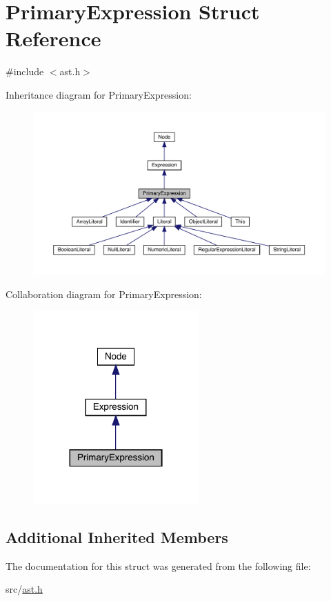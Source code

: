 \hypertarget{struct_primary_expression}{}\section{Primary\+Expression Struct Reference}
\label{struct_primary_expression}


{\ttfamily \#include $<$ast.\+h$>$}



Inheritance diagram for Primary\+Expression\+:\nopagebreak
\begin{figure}[H]
\begin{center}
\leavevmode
\includegraphics[width=350pt]{struct_primary_expression__inherit__graph}
\end{center}
\end{figure}


Collaboration diagram for Primary\+Expression\+:\nopagebreak
\begin{figure}[H]
\begin{center}
\leavevmode
\includegraphics[width=180pt]{struct_primary_expression__coll__graph}
\end{center}
\end{figure}
\subsection*{Additional Inherited Members}


The documentation for this struct was generated from the following file\+:\begin{DoxyCompactItemize}
\item 
src/\hyperlink{ast_8h}{ast.\+h}\end{DoxyCompactItemize}
